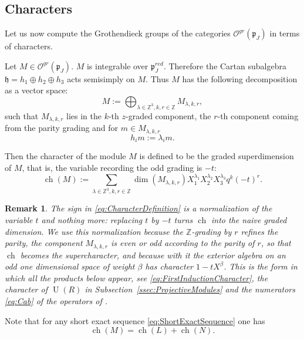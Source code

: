 \documentclass[10pt]{amsart}
\newtheorem{remark}[theorem]{Remark}
\newcommand{\fsl}{{\mathfrak sl}}
\newcommand{\fp}{{\mathfrak p}}
\newcommand{\fh}{{\mathfrak h}}
\newcommand{\Ddeg}{D(2|1,\mathrm{deg})}
\DeclareMathOperator{\ch}{ch}
\DeclareMathOperator{\U}{U}
\begin{document}
	\subsection{Characters}\label{ssec:Characters}
	Let us now compute the Grothendieck groups of the categories $\mathcal{O}^{gr}(\fp_J)$ in terms of characters.
	
	Let $M \in \mathcal{O}^{gr}(\fp_J)$. $M$ is integrable over $\fp_J^{red}$. Therefore the Cartan subalgebra $\fh= h_1 \oplus h_2 \oplus h_3$ acts semisimply on $M$. Thus $M$ has the following decomposition as a vector space:
	\begin{equation*}
		M:=\bigoplus_{\lambda \in \mathbb{Z}^3,k,r\in \mathbb{Z}}M_{\lambda,k,r},
	\end{equation*}
	such that $M_{\lambda,k,r}$ lies in the $k$-th $z$-graded component, the $r$-th component coming from the parity grading and for $m \in M_{\lambda,k,r}$
	\[h_i m:=\lambda_i m.\]
	
	Then the character of the module $M$ is defined to be the graded superdimension of $M$, that is, the variable recording the odd grading is $-t$:
	\begin{equation}\label{eq:CharacterDefinition}
		\ch(M):=\sum_{\lambda \in \mathbb{Z}^3,k,r\in \mathbb{Z}} \dim(M_{\lambda,k,r})X_1^{\lambda_1}X_2^{\lambda_2}X_3^{\lambda_3}q^k(-t)^r.
	\end{equation}
	
	\begin{remark}\label{rem:SignConvention}
		The sign in \eqref{eq:CharacterDefinition} is a normalization of the variable $t$ and nothing more: replacing $t$ by $-t$ turns $\ch$ into the naive graded dimension. We use this normalization because the $\mathbb{Z}$-grading by $r$ refines the parity, the component $M_{\lambda,k,r}$ is even or odd according to the parity of $r$, so that $\ch$ becomes the supercharacter, and because with it the exterior algebra on an odd one dimensional space of weight $\beta$ has character $1-tX^{\beta}$. This is the form in which all the products below appear, see \eqref{eq:FirstInductionCharacter}, the character of $\U(R)$ in Subsection~\ref{ssec:ProjectiveModules} and the numerators \eqref{eq:Cab} of the operators of \cite{ArthamonovShakirov-2019}.
	\end{remark}
	
	
	Note that for any short exact sequence \eqref{eq:ShortExactSequence} one has
	\[\ch(M)=\ch(L)+\ch(N).\]
	
\end{document}
